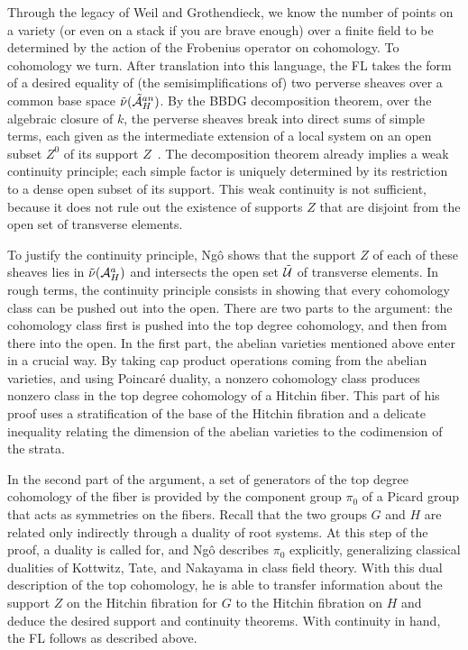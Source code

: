 Through the legacy of Weil and Grothendieck, we know the number of
points on a variety (or even on a stack if you are brave enough) over
a finite field to be determined by the action of the Frobenius operator on
cohomology.  To cohomology we turn.  After translation into this
language, the FL takes the form of a desired equality of (the semisimplifications of) two perverse
sheaves over a common base space $\tilde\nu(\tilde\AA^{an}_H)$.  By the
BBDG decomposition theorem, over the algebraic closure of $k$, the
perverse sheaves break into  direct sums of simple terms, each given
as the intermediate extension of a local system on an open subset
$Z^0$ of its support $Z$~\cite{BBDG:1982}.  The decomposition theorem
already implies a weak continuity principle; each simple factor is
uniquely determined by its restriction to a dense open subset of its
support.  This weak continuity is not sufficient, because it does not
rule out the existence of supports $Z$ that are disjoint from the open
set of transverse elements.

To justify the continuity principle, Ng\^o shows that the support $Z$
of each of these sheaves lies in $\tilde\nu(\AA^a_H)$ and
intersects the open set $\tilde\UU$ of transverse
elements.  In rough terms, the continuity principle consists in
showing that every cohomology class can be pushed out into the open.
There are two parts to the argument: the cohomology class first is
pushed into the top degree cohomology, and then from there into the
open.  In the first part, the abelian varieties mentioned above enter
in a crucial way.  By taking cap product operations coming from the
abelian varieties, and using Poincar\'e duality, a nonzero cohomology
class produces nonzero class in the top degree cohomology of a Hitchin
fiber.  This part of his proof uses a stratification of the base of
the Hitchin fibration and a delicate inequality relating the dimension
of the abelian varieties to the codimension of the strata.

In the second part of the argument, a set of generators of the top
degree cohomology of the fiber is provided by the component group
$\pi_0$ of a Picard group that acts as symmetries on the fibers.
Recall that the two groups $G$ and $H$ are related only indirectly
through a duality of root systems.  At this step of the proof, a
duality is called for, and Ng\^o describes $\pi_0$ explicitly,
generalizing classical dualities of Kottwitz, Tate, and Nakayama in
class field theory.  With this dual description of the top cohomology,
he is able to transfer information about the support $Z$ on the
Hitchin fibration for $G$ to the Hitchin fibration on $H$ and deduce
the desired support and continuity theorems.  With continuity in hand,
the FL follows as described above.

